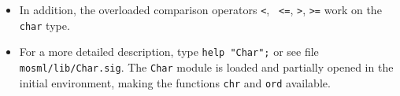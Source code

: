 \documentclass[fleqn,a4paper]{article}
\begin{document}
\begin{itemize}
\item In addition, the overloaded comparison operators {\tt <}, {\tt
    <=}, {\tt >}, {\tt >=} work on the {\tt char} type.

\item For a more detailed description, type {\tt help "Char";} or see
  file {\tt mosml/lib/Char.sig}.  The {\tt Char} module is loaded and
  partially opened in the initial environment, making the functions
  {\tt chr} and {\tt ord} available.
\end{itemize}

%
%
%
% 
%
%
%
\end{document}
